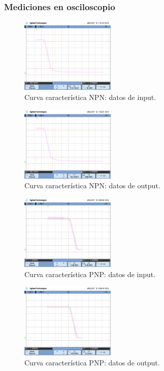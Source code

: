 \subsubsection{Mediciones en osciloscopio}
\begin{multicols}{2}

\begin{figure}[H]
  \centering
    \includegraphics[width=0.4\textwidth]{ejercicio1/scope_x_Punto1_NPN}
    \caption{Curva caracter\'istica NPN: datos de input.} %
\end{figure}

\begin{figure}[H]
  \centering
    \includegraphics[width=0.4\textwidth]{ejercicio1/scope_y_Punto1_NPN}
    \caption{Curva caracter\'istica NPN: datos de output.} %
\end{figure}

\begin{figure}[H]
  \centering
    \includegraphics[width=0.4\textwidth]{ejercicio1/scope_x_Punto1_PNP}
    \caption{Curva caracter\'istica PNP: datos de input.} %
\end{figure}

\begin{figure}[H]
  \centering
    \includegraphics[width=0.4\textwidth]{ejercicio1/scope_y_Punto1_PNP}
    \caption{Curva caracter\'istica PNP: datos de output.} %
\end{figure}


\end{multicols}
